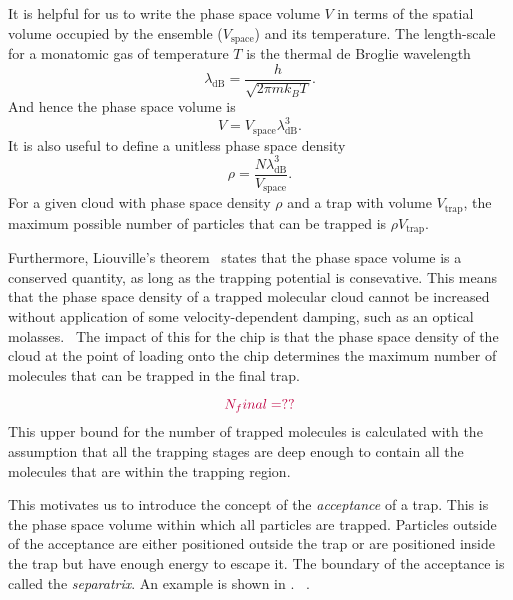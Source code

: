 It is helpful for us to write the phase space volume $V$ in terms of the
spatial volume occupied by the ensemble ($V_\text{space}$) and its temperature.
The length-scale for a monatomic gas of temperature $T$ is the thermal de
Broglie wavelength~\cite{blundell2}
%
\begin{equation}
  \lambda_\text{dB} = \frac{h}{\sqrt{2 \pi m k_B T}}.
\end{equation}
And hence the phase space volume is 
%
\begin{equation}
  V = V_\text{space} \lambda_\text{dB}^3.
\end{equation}
%
It is also useful to define a unitless phase space
density~\cite{PhysRevA.52.1423}
%
\begin{equation}
  \rho = \frac{N \lambda_\text{dB}^3}{V_\text{space}}.
\end{equation}
%
For a given cloud with phase space density $\rho$ and a trap with volume
$V_\text{trap}$,
the maximum possible number of particles that can be trapped is $\rho
V_\text{trap}$.

Furthermore, Liouville's theorem~\cite{Landau1982, Hand1998} states that the
phase space volume is a conserved quantity, as long as the trapping potential
is consevative. This means that the phase space density of a trapped molecular
cloud cannot be increased without application of some velocity-dependent
damping, such as an optical molasses.~\cite{} The impact of this for the chip
is that the phase space density of the cloud at the point of loading onto the
chip determines the maximum number of molecules that can be trapped in the
final trap.


%
\begin{equation}
  \textcolor{purple}{N_final = ??}
  \label{design:eq:psd_N}
\end{equation}
%
This upper bound for the number of trapped molecules is calculated with the
assumption that all the trapping stages are deep enough to contain all the
molecules that are within the trapping region. 

This motivates us to introduce the concept of the \emph{acceptance} of a trap.
This is the phase space volume within which all particles are trapped.
Particles outside of the acceptance are either positioned outside the trap or
are positioned inside the trap but have enough energy to escape it. The
boundary of the acceptance is called the \emph{separatrix}. An example is shown
in .~\cite{Lichtenberg1969, HanHand1998}
.

